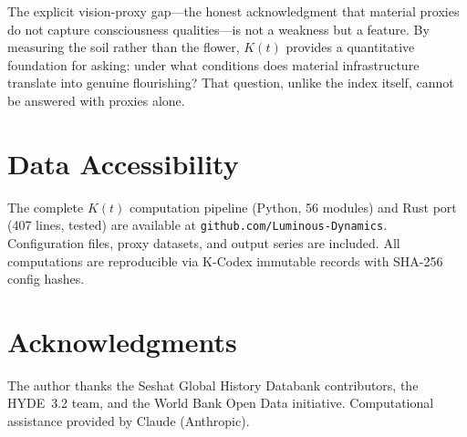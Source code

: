 \documentclass[10pt,letterpaper]{article}
\newcommand{\kt}{$K(t)$}
\begin{document}
The explicit vision-proxy gap---the honest acknowledgment that material
proxies do not capture consciousness qualities---is not a weakness but a
feature. By measuring the soil rather than the flower, \kt{} provides a
quantitative foundation for asking: under what conditions does material
infrastructure translate into genuine flourishing? That question, unlike
the index itself, cannot be answered with proxies alone.

\section*{Data Accessibility}

The complete \kt{} computation pipeline (Python, 56 modules) and Rust
port (407 lines, tested) are available at
\texttt{github.com/Luminous-Dynamics}. Configuration files, proxy
datasets, and output series are included. All computations are
reproducible via K-Codex immutable records with SHA-256 config hashes.

\section*{Acknowledgments}

The author thanks the Seshat Global History Databank contributors, the
HYDE~3.2 team, and the World Bank Open Data initiative. Computational
assistance provided by Claude (Anthropic).
\end{document}
